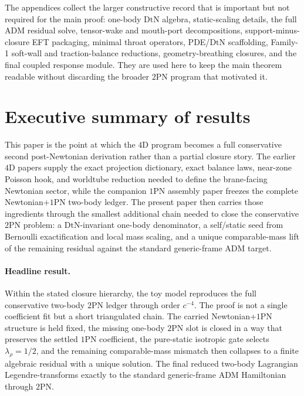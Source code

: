 \documentclass[11pt]{article}
\newcommand{\OnePN}{\mathrm{1PN}}
\newcommand{\TwoPN}{\mathrm{2PN}}
\newcommand{\ADM}{\mathrm{ADM}}
\newcommand{\DtN}{\mathrm{DtN}}
\begin{document}
The appendices collect the larger constructive record that is important but not required for the main proof:
one-body $\DtN$ algebra, static-scaling details, the full $\ADM$ residual solve, tensor-wake and mouth-port decompositions, support-minus-closure EFT packaging, minimal throat operators, PDE/$\DtN$ scaffolding, Family-1 soft-wall and traction-balance reductions, geometry-breathing closures, and the final coupled response module.
They are used here to keep the main theorem readable without discarding the broader $2$PN program that motivated it.


\section{Executive summary of results}
\label{sec:executive}

This paper is the point at which the $4$D program becomes a full conservative second post-Newtonian derivation rather than a partial closure story. The earlier $4$D papers supply the exact projection dictionary, exact balance laws, near-zone Poisson hook, and worldtube reduction needed to define the brane-facing Newtonian sector, while the companion $1$PN assembly paper freezes the complete Newtonian+$\OnePN$ two-body ledger. The present paper then carries those ingredients through the smallest additional chain needed to close the conservative $2$PN problem: a $\DtN$-invariant one-body denominator, a self/static seed from Bernoulli exactification and local mass scaling, and a unique comparable-mass lift of the remaining residual against the standard generic-frame $\ADM$ target.

\paragraph{Headline result.}
Within the stated closure hierarchy, the toy model reproduces the full conservative two-body $\TwoPN$ ledger through order $c^{-4}$. The proof is not a single coefficient fit but a short triangulated chain. The carried Newtonian+$\OnePN$ structure is held fixed, the missing one-body $\TwoPN$ slot is closed in a way that preserves the settled $\OnePN$ coefficient, the pure-static isotropic gate selects $\lambda_\rho=1/2$, and the remaining comparable-mass mismatch then collapses to a finite algebraic residual with a unique solution. The final reduced two-body Lagrangian Legendre-transforms exactly to the standard generic-frame $\ADM$ Hamiltonian through $\TwoPN$.
\end{document}

